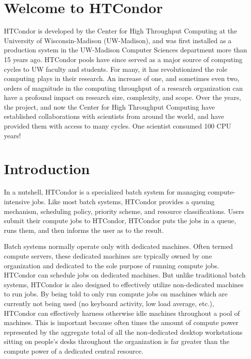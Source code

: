 \section{Welcome to HTCondor}  
%
% 
%

\label{sec:usermanual}
HTCondor is developed by
the Center for High Throughput Computing at the University of Wisconsin-Madison (UW-Madison), and
was first installed as a production system in the UW-Madison Computer
Sciences department more than 15 years ago. HTCondor pools have since
served as a major source of computing cycles to UW faculty and students.
For many, it has revolutionized the role computing plays in their
research. An increase of one, and sometimes even two, orders of
magnitude in the computing throughput of a research organization can
have a profound impact on research size, complexity, and scope. 
Over the years, the project, and now the Center for High Throughput Computing 
have established collaborations with scientists
from around the world, and have provided them with access to many
cycles. One scientist consumed 100 CPU years!

\section{Introduction}

In a nutshell, HTCondor is a specialized batch system 
for managing compute-intensive jobs.
Like most batch systems, HTCondor provides a
queuing mechanism, scheduling policy, priority scheme, and resource
classifications.  Users submit their compute jobs to HTCondor, HTCondor puts
the jobs in a queue, runs them, and then informs the user as to the
result.

Batch systems normally operate only with dedicated machines.  Often 
termed compute servers, these dedicated machines are typically owned by
one organization and dedicated to the sole purpose of running compute
jobs.  HTCondor can schedule jobs on dedicated machines.  But unlike traditional 
batch systems, HTCondor is also designed to effectively 
utilize non-dedicated machines to run jobs.  By being told to only
run compute jobs on machines which are currently not being used (no keyboard
activity, low load average, etc.), HTCondor can
effectively harness otherwise idle machines throughout a pool of machines.
This is important because often times the amount of
compute power represented by the aggregate total of all the non-dedicated 
desktop workstations sitting on people's desks throughout the
organization is far greater than the compute power of a dedicated
central resource.

